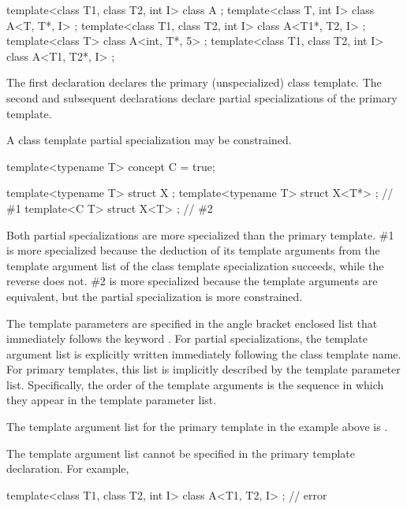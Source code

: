 \pnum
\begin{example}
\begin{codeblock}
template<class T1, class T2, int I> class A             { };
template<class T, int I>            class A<T, T*, I>   { };
template<class T1, class T2, int I> class A<T1*, T2, I> { };
template<class T>                   class A<int, T*, 5> { };
template<class T1, class T2, int I> class A<T1, T2*, I> { };
\end{codeblock}

The first declaration declares the primary (unspecialized) class template.
The second and subsequent declarations declare partial specializations of
the primary template.
\end{example}

\pnum
A class template partial specialization may be constrained.
\begin{example}
\begin{codeblock}
template<typename T> concept C = true;

template<typename T> struct X { };
template<typename T> struct X<T*> { };          // \#1
template<C T> struct X<T> { };                  // \#2
\end{codeblock}
Both partial specializations are more specialized than the primary template.
\#1 is more specialized because the deduction of its template arguments
from the template argument list of the class template specialization succeeds,
while the reverse does not.
\#2 is more specialized because the template arguments are equivalent,
but the partial specialization is more constrained.
\end{example}

\pnum
The template parameters are specified in the angle bracket enclosed list
that immediately follows the keyword
.
For partial specializations, the template argument list is explicitly
written immediately following the class template name.
For primary templates, this list is implicitly described by the
template parameter list.
Specifically, the order of the template arguments is the sequence in
which they appear in the template parameter list.
\begin{example}
The template argument list for the primary template in the example
above is
.
\end{example}
\begin{note}
The template argument list cannot be specified in the primary template
declaration.
For example,

\begin{codeblock}
template<class T1, class T2, int I>
class A<T1, T2, I> { };                         // error
\end{codeblock}
\end{note}

